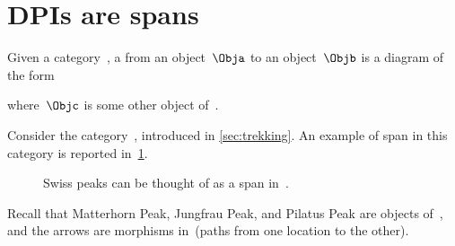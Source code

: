 

\section{DPIs are spans}
\label{sec:spans}


\begin{ctdefinition}[Span]
  \label{def:span}
  Given a category~\CatC, a \emph{} from an object~$\Obja$ to an object~$\Objb$ is a diagram of the form
  \begin{center}
  \end{center}
  where~$\Objc$ is some other object of~\CatC.
\end{ctdefinition}

\begin{example}
  Consider the category~\Berg, introduced in \cref{sec:trekking}. An example of span in this category is reported in~\cref{fig:exmountains}.
  \begin{figure}[h!]
    \begin{center}
    \end{center}
    \caption{Swiss peaks can be thought of as a span in~\Berg. \label{fig:exmountains}}
  \end{figure}
  Recall that \textsf{Matterhorn Peak}, \textsf{Jungfrau Peak}, and \textsf{Pilatus Peak} are objects of~\Berg, and the arrows are morphisms in~\Berg (paths from one location to the other).
\end{example}



